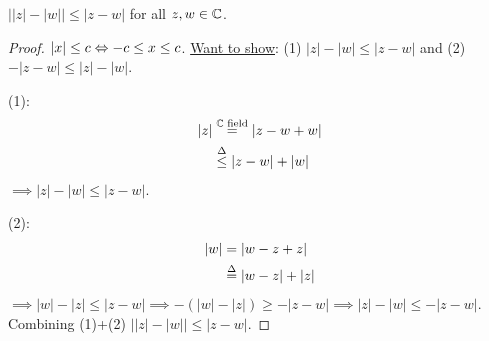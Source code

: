 \documentclass[]{article}
\begin{document}
\begin{example}
	[HW3.4] $\left| |z|-|w|\right| \leq |z-w|$ for all $z,w\in\mathbb{C}$.
	\begin{proof}
		$|x|\leq c \Leftrightarrow -c\leq x \leq c$.
		\ul{Want to show}: (1) $|z|-|w| \leq |z-w|$ and (2) $-|z-w|\leq |z|-|w|$.

		(1): 
		\begin{align*}
			|z| &\overset{\mathbb{C}\text{ field}}{=} |z-w+w| \\
				&\overset{\Delta}{\leq} |z-w| + |w|		
		\end{align*}
		$\implies |z|-|w|\leq |z-w|$.

		(2):
		\begin{align*}
			|w| &= |w-z+z| \\
				&\overset{\Delta}{=} |w-z|+|z|
		\end{align*}
		$\implies |w|-|z|\leq |z-w| \implies -(|w|-|z|) \geq -|z-w| \implies |z|-|w| \leq -|z-w|$.
		Combining (1)+(2) $\left||z|-|w|\right| \leq |z-w|$.
	\end{proof}
\end{example}
\end{document}
